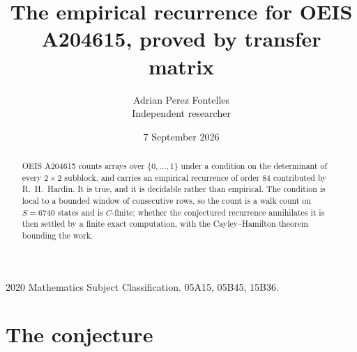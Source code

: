 \documentclass[11pt,a4paper]{article}
\title{The empirical recurrence for OEIS A204615, proved by transfer matrix}
\author{Adrian Perez Fontelles\\ \small Independent researcher}
\date{7 September 2026}
\theoremstyle{plain}
\theoremstyle{definition}
\begin{document}
\maketitle

\begin{abstract}
OEIS A204615 counts arrays over $\{0,\dots,1\}$ under a condition on the determinant of every
$2\times2$ subblock, and carries an empirical recurrence of order $84$ contributed by
R.~H.~Hardin. It is true, and it is decidable rather than empirical. The condition is local to
a bounded window of consecutive rows, so the count is a walk count on $S=6740$ states and is
$C$-finite; whether the conjectured recurrence annihilates it is then settled by a finite exact
computation, with the Cayley--Hamilton theorem bounding the work.
\end{abstract}

\noindent\small 2020 Mathematics Subject Classification. 05A15, 05B45, 15B36.\normalsize

\section{The conjecture}
\end{document}
